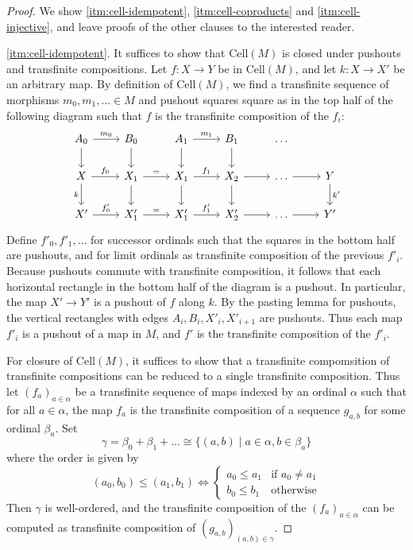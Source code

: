 \documentclass[a4paper]{article}
\theoremstyle{remark}
\theoremstyle{definition}
\begin{document}
\begin{proof}
  We show \ref{itm:cell-idempotent}, \ref{itm:cell-coproducts} and \ref{itm:cell-injective}, and leave proofs of the other clauses to the interested reader.

  \ref{itm:cell-idempotent}.
  It suffices to show that $\mathrm{Cell}(M)$ is closed under pushouts and transfinite compositions.
  Let $f : X \rightarrow Y$ be in $\mathrm{Cell}(M)$, and let $k : X \rightarrow X'$ be an arbitrary map.
  By definition of $\mathrm{Cell}(M)$, we find a transfinite sequence of morphisms $m_0, m_1, \dots \in M$ and pushout squares square as in the top half of the following diagram such that $f$ is the transfinite composition of the $f_i$:
  \begin{equation}
    \begin{tikzcd}
      A_0 \arrow[r, "m_0"] \arrow[d] & B_0 \arrow[d] & A_1 \arrow[d] \arrow[r, "m_1"] & B_1 \arrow[d] & \dots \\
      X \arrow[d, "k"'] \arrow[r, "f_0"] & X_1 \arrow[d] \arrow[r, "="] & X_1 \arrow[d] \arrow[r, "f_1"] & X_2 \arrow[d] \arrow[r] & \dots \arrow[r] & Y \arrow[d, "k'"] \\
      X' \arrow[r, "f'_0"] & X'_1 \arrow[r, "="] & X'_1 \arrow[r, "f'_1"] & X'_2 \arrow[r] & \dots \arrow[r] & Y'
    \end{tikzcd}
  \end{equation}
  Define $f'_0, f'_1, \dots$ for successor ordinals such that the squares in the bottom half are pushouts, and for limit ordinals as transfinite composition of the previous $f'_i$.
  Because pushouts commute with transfinite composition, it follows that each horizontal rectangle in the bottom half of the diagram is a pushout.
  In particular, the map $X' \rightarrow Y'$ is a pushout of $f$ along $k$.
  By the pasting lemma for pushouts, the vertical rectangles with edges $A_i, B_i, X'_i, X'_{i + 1}$ are pushouts.
  Thus each map $f'_i$ is a pushout of a map in $M$, and $f'$ is the transfinite composition of the $f'_i$.

  For closure of $\mathrm{Cell}(M)$, it suffices to show that a transfinite compomsition of transfinite compositions can be reduced to a single transfinite composition.
  Thus let $(f_a)_{a \in \alpha}$ be a transfinite sequence of maps indexed by an ordinal $\alpha$ such that for all $a \in \alpha$, the map $f_a$ is the transfinite composition of a sequence $g_{a, b}$ for some ordinal $\beta_a$.
  Set
  \begin{equation}
    \gamma = \beta_0 + \beta_1 + \dots \cong \{ (a, b) \mid a \in \alpha, b \in \beta_a \}
  \end{equation}
  where the order is given by
  \begin{equation}
    (a_0, b_0) \leq (a_1, b_1) \iff \begin{cases}
      a_0 \leq a_1 & \text{if } a_0 \neq a_1 \\
      b_0 \leq b_1 & \text{otherwise}
    \end{cases}
  \end{equation}
  Then $\gamma$ is well-ordered, and the transfinite composition of the $(f_a)_{a \in \alpha}$ can be computed as transfinite composition of $(g_{a, b})_{(a, b) \in \gamma}$.


\end{proof}
\end{document}
